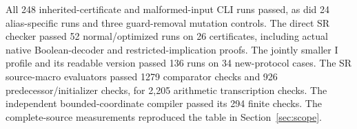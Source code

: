 All 248 inherited-certificate and malformed-input CLI runs passed, as did 24 alias-specific runs and three guard-removal mutation controls. The direct SR checker passed 52 normal/optimized runs on 26 certificates, including actual native Boolean-decoder and restricted-implication proofs. The jointly smaller I profile and its readable version passed 136 runs on 34 new-protocol cases. The SR source-macro evaluators passed 1279 comparator checks and 926 predecessor/initializer checks, for 2,205 arithmetic transcription checks. The independent bounded-coordinate compiler passed its 294 finite checks. The complete-source measurements reproduced the table in Section~\ref{sec:scope}.
